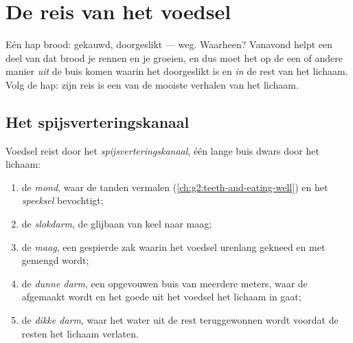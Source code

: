 \chapter{De reis van het voedsel}\label{ch:g4:journey-of-food}

Eén hap brood: gekauwd, doorgeslikt --- weg. Waarheen? Vanavond helpt
een deel van dat brood je  rennen en je  groeien, en dus moet
het op de een of andere manier \emph{uit} de buis komen waarin het
doorgeslikt is en \emph{in} de rest van het lichaam. Volg de hap: zijn
reis is een van de mooiste verhalen van het lichaam.

\section{Het spijsverteringskanaal}

\begin{definition}\label{def:g4:journey-of-food:tract}
Voedsel reist door het
\emph{spijsverteringskanaal}, één lange
buis dwars door het lichaam:
\begin{enumerate}
  \item de \emph{mond}, waar de tanden vermalen
        (\cref{ch:g2:teeth-and-eating-well}) en het
        \emph{speeksel} bevochtigt;
  \item de \emph{slokdarm}, de glijbaan van keel naar maag;
  \item de \emph{maag}, een gespierde zak waarin het voedsel
        urenlang gekneed en met  gemengd wordt;
  \item de \emph{dunne darm}, een opgevouwen buis van
        meerdere meters, waar de  afgemaakt wordt en het goede
        uit het voedsel het lichaam in gaat;
  \item de \emph{dikke darm}, waar het water uit de
        rest teruggewonnen wordt voordat de resten het lichaam verlaten.
\end{enumerate}
\end{definition}


